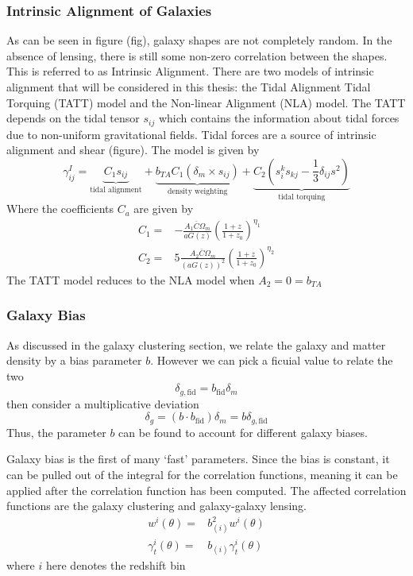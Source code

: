 \subsubsection{Intrinsic Alignment of Galaxies}
As can be seen in figure (fig), galaxy shapes are not completely random. In the absence of lensing, there is still some non-zero correlation between the shapes. This is referred to as Intrinsic Alignment. There are two models of intrinsic alignment that will be considered in this thesis: the Tidal Alignment Tidal Torquing (TATT) model and the Non-linear Alignment (NLA) model. The TATT depends on the tidal tensor $s_{ij}$ which contains the information about tidal forces due to non-uniform gravitational fields. Tidal forces are a source of intrinsic alignment and shear (figure). The model is given by
\begin{equation}
	\gamma_{ij}^I = \underbrace{C_1s_{ij}}_{\text{tidal alignment}}+
	\underbrace{b_{TA}C_1(\delta_m\times s_{ij})}_{\text{density weighting}}+
	\underbrace{C_2\left( s_i^ks_{kj}-\frac{1}{3}\delta_{ij}s^2 \right)}_{\text{tidal torquing}}
\end{equation}
Where the coefficients $C_a$ are given by
\begin{equation}
	\begin{split}
		C_1 =& -\frac{A_1\bar{C}\Omega_m}{aG(z)}\left(\frac{1+z}{1+z_0}\right)^{\eta_1} \\
		C_2 =& 5\frac{A_2\bar{C}\Omega_m}{(aG(z))^2}\left(\frac{1+z}{1+z_0}\right)^{\eta_2}
	\end{split}
\end{equation}
The TATT model reduces to the NLA model when $A_2=0=b_{TA}$
\subsubsection{Galaxy Bias}
As discussed in the galaxy clustering section, we relate the galaxy and matter density by a bias parameter $b$. However we can pick a ficuial value to relate the two
\begin{equation}
	\delta_{g,\text{fid}} = b_{\text{fid}}\delta_m
\end{equation}
then consider a multiplicative deviation
\begin{equation}
	\delta_g = (b\cdot b_{\text{fid}})\delta_m = b\delta_{g,\text{fid}}
\end{equation}
Thus, the parameter $b$ can be found to account for different galaxy biases. 

Galaxy bias is the first of many `fast' parameters. Since the bias is constant, it can be pulled out of the integral for the correlation functions, meaning it can be applied after the correlation function has been computed. The affected correlation functions are the galaxy clustering and galaxy-galaxy lensing.
\begin{equation}
	\begin{split}
		w^i(\theta) =& b_{(i)}^2w^i(\theta) \\
		\gamma^i_t(\theta) =& b_{(i)}\gamma_t^i(\theta)
	\end{split}
\end{equation}
where $i$ here denotes the redshift bin
